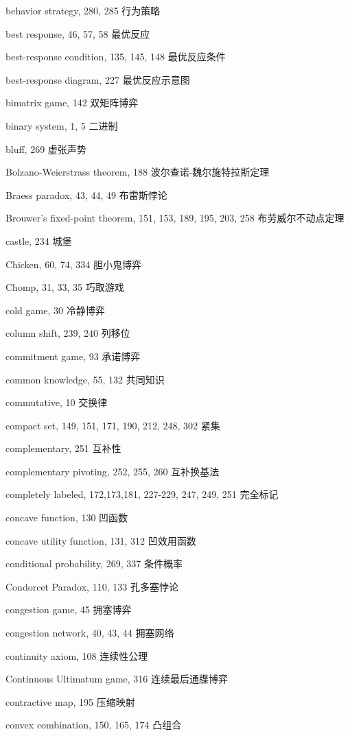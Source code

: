 behavior strategy, 280, 285  行为策略

best response, 46, 57, 58  最优反应

best-response condition, 135, 145, 148  最优反应条件

best-response diagram, 227  最优反应示意图

bimatrix game, 142  双矩阵博弈

binary system, 1, 5  二进制

bluff, 269 虚张声势

Bolzano-Weierstrass theorem, 188  波尔查诺-魏尔施特拉斯定理

Braess paradox, 43, 44, 49 布雷斯悖论

Brouwer's fixed-point theorem, 151, 153, 189, 195, 203, 258  布劳威尔不动点定理 

castle, 234  城堡

Chicken, 60, 74, 334 胆小鬼博弈

Chomp, 31, 33, 35  {\color{blue} 巧取游戏}

cold game, 30  {\color{blue}  冷静博弈 }

column shift, 239, 240  {\color{blue} 列移位}

commitment game, 93  承诺博弈

common knowledge, 55, 132  共同知识

commutative, 10  交换律

compact set, 149, 151, 171, 190, 212, 248, 302  紧集

complementary, 251  互补性

complementary pivoting, 252, 255, 260  {\color{blue} 互补换基法}

completely labeled, 172,173,181, 227-229, 247, 249, 251  完全标记

concave function, 130  凹函数

concave utility function, 131, 312 凹效用函数

conditional probability, 269, 337  条件概率

Condorcet Paradox, 110, 133  孔多塞悖论

congestion game, 45  拥塞博弈

congestion network, 40, 43, 44  拥塞网络

continuity axiom, 108  连续性公理

Continuous Ultimatum game, 316  连续最后通牒博弈

contractive map, 195  压缩映射

convex combination, 150, 165, 174  凸组合

